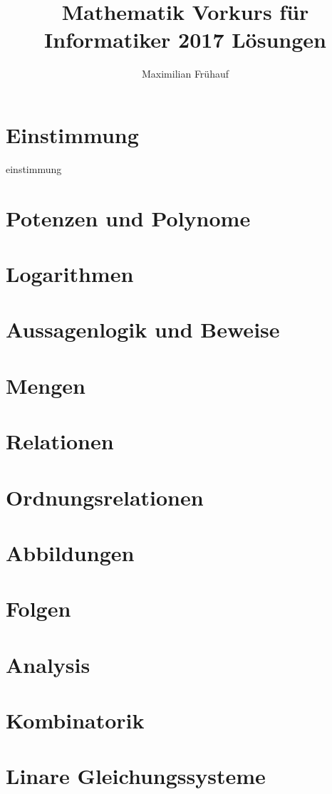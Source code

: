 \documentclass[a4paper, 10pt]{article}
\title{Mathematik Vorkurs für Informatiker 2017 Lösungen}
\author{Maximilian Frühauf}
\begin{document}
\maketitle

\section{Einstimmung} 
{einstimmung}

\section{Potenzen und Polynome}

\section{Logarithmen}

\section{Aussagenlogik und Beweise}

\section{Mengen}

\section{Relationen}

\section{Ordnungsrelationen}

\section{Abbildungen}

\section{Folgen}

\section{Analysis}

\section{Kombinatorik}

\section{Linare Gleichungssysteme}
\end{document}
